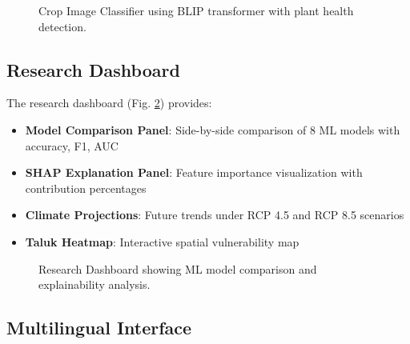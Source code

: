\documentclass[journal,10pt,twoside]{IEEEtran}
\begin{document}
\begin{figure}[!t]
\centering
{}
\caption{Crop Image Classifier using BLIP transformer with plant health detection.}
\label{fig:app_classifier}
\end{figure}

\subsection{Research Dashboard}

The research dashboard (Fig. \ref{fig:app_research}) provides:

\begin{itemize}
    \item \textbf{Model Comparison Panel}: Side-by-side comparison of 8 ML models with accuracy, F1, AUC
    \item \textbf{SHAP Explanation Panel}: Feature importance visualization with contribution percentages
    \item \textbf{Climate Projections}: Future trends under RCP 4.5 and RCP 8.5 scenarios
    \item \textbf{Taluk Heatmap}: Interactive spatial vulnerability map
\end{itemize}

\begin{figure}[!t]
\centering
{}
\caption{Research Dashboard showing ML model comparison and explainability analysis.}
\label{fig:app_research}
\end{figure}

\subsection{Multilingual Interface}
\end{document}
